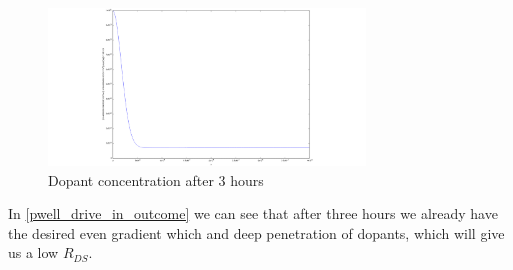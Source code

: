 \begin{figure}[H]
	\centering
	\includegraphics[width=0.75\textwidth]{p-well-diffusion.png}
	\caption{Dopant concentration after 3 hours}
	\label{pwell_drive_in_outcome}
\end{figure}

In \autoref{pwell_drive_in_outcome} we can see that after three hours we already have the desired even gradient which and deep penetration of dopants, which will give us a low $R_{DS}$.